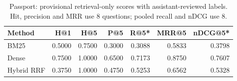 \begin{table}[htbp]\centering\small
\caption{Passport: provisional retrieval-only scores with assistant-reviewed labels. Hit, precision and MRR use 8 questions; pooled recall and nDCG use 8.}\label{tab:retrieval-passport}
\begin{tabularx}{\linewidth}{Xrrrrrr}\toprule
Method & H@1 & H@5 & P@5 & R@5* & MRR@5 & nDCG@5*\\\midrule
BM25 & 0.5000 & 0.7500 & 0.3000 & 0.3088 & 0.5833 & 0.3798\\
Dense & 0.7500 & 1.0000 & 0.6500 & 0.7173 & 0.8750 & 0.7607\\
Hybrid RRF & 0.3750 & 1.0000 & 0.4750 & 0.5253 & 0.6562 & 0.5328\\
\bottomrule\end{tabularx}\end{table}
